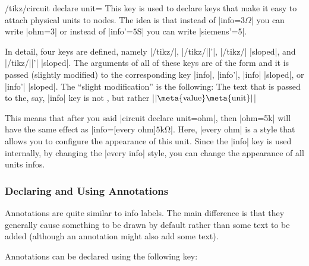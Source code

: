 \begin{key}{/tikz/circuit declare unit=}
    This key is used to declare keys that make it easy to attach physical units
    to nodes. The idea is that instead of |info=$3\Omega$| you can write
    |ohm=3| or instead of |info'=$5\mathrm{S}$| you can write |siemens'=5|.

    In detail, four keys are defined, namely |/tikz/|,
    |/tikz/||'|, |/tikz/| |sloped|, and
    |/tikz/||'| |sloped|. The arguments of all of these keys are of
    the form  and it is
    passed (slightly modified) to the corresponding key |info|, |info'|, |info|
    |sloped|, or |info'| |sloped|. The ``slight modification'' is the
    following: The text that is passed to the, say, |info| key is not
    , but rather |$\mathrm{|\meta{value}\meta{unit}|}$|

    This means that after you said |circuit declare unit={ohm}{\Omega}|, then
    |ohm=5k| will have the same effect as
    |info={[every ohm]$\mathrm{5k\Omega}$}|. Here, |every ohm| is a style that
    allows you to configure the appearance of this unit. Since the |info| key
    is used internally, by changing the |every info| style, you can change the
    appearance of all units infos.
\begin{codeexample}[]
\end{codeexample}
\end{key}


\subsubsection{Declaring and Using Annotations}

Annotations are quite similar to info labels. The main difference is that they
generally cause something to be drawn by default rather than some text to be
added (although an annotation might also add some text).

Annotations can be declared using the following key:

